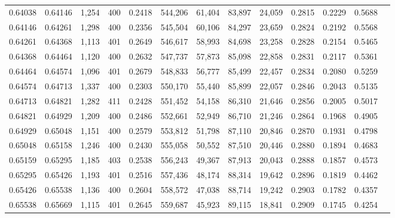 \begin{tabular}{rrrrrrrrrrrrr}
0.64038 & 0.64146 & 1,254 & 400 &                                     0.2418 & 544,206 &  61,404 &  83,897 &  24,059 & 0.2815 & 0.2229 & 0.5688 \\
0.64146 & 0.64261 & 1,298 & 400 &                                     0.2356 & 545,504 &  60,106 &  84,297 &  23,659 & 0.2824 & 0.2192 & 0.5568 \\
0.64261 & 0.64368 & 1,113 & 401 &                                     0.2649 & 546,617 &  58,993 &  84,698 &  23,258 & 0.2828 & 0.2154 & 0.5465 \\
0.64368 & 0.64464 & 1,120 & 400 &                                     0.2632 & 547,737 &  57,873 &  85,098 &  22,858 & 0.2831 & 0.2117 & 0.5361 \\
0.64464 & 0.64574 & 1,096 & 401 &                                     0.2679 & 548,833 &  56,777 &  85,499 &  22,457 & 0.2834 & 0.2080 & 0.5259 \\
0.64574 & 0.64713 & 1,337 & 400 &                                     0.2303 & 550,170 &  55,440 &  85,899 &  22,057 & 0.2846 & 0.2043 & 0.5135 \\
0.64713 & 0.64821 & 1,282 & 411 &                                     0.2428 & 551,452 &  54,158 &  86,310 &  21,646 & 0.2856 & 0.2005 & 0.5017 \\
0.64821 & 0.64929 & 1,209 & 400 &                                     0.2486 & 552,661 &  52,949 &  86,710 &  21,246 & 0.2864 & 0.1968 & 0.4905 \\
0.64929 & 0.65048 & 1,151 & 400 &                                     0.2579 & 553,812 &  51,798 &  87,110 &  20,846 & 0.2870 & 0.1931 & 0.4798 \\
0.65048 & 0.65158 & 1,246 & 400 &                                     0.2430 & 555,058 &  50,552 &  87,510 &  20,446 & 0.2880 & 0.1894 & 0.4683 \\
0.65159 & 0.65295 & 1,185 & 403 &                                     0.2538 & 556,243 &  49,367 &  87,913 &  20,043 & 0.2888 & 0.1857 & 0.4573 \\
0.65295 & 0.65426 & 1,193 & 401 &                                     0.2516 & 557,436 &  48,174 &  88,314 &  19,642 & 0.2896 & 0.1819 & 0.4462 \\
0.65426 & 0.65538 & 1,136 & 400 &                                     0.2604 & 558,572 &  47,038 &  88,714 &  19,242 & 0.2903 & 0.1782 & 0.4357 \\
0.65538 & 0.65669 & 1,115 & 401 &                                     0.2645 & 559,687 &  45,923 &  89,115 &  18,841 & 0.2909 & 0.1745 & 0.4254 \\

\end{tabular}
